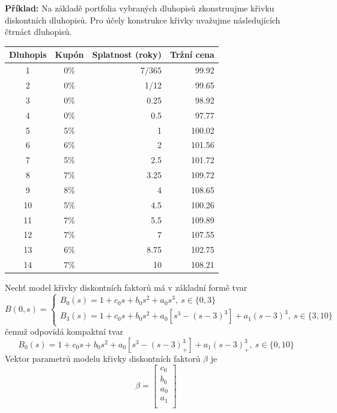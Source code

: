 \documentclass[a4paper]{book}
\begin{document}
\noindent \textbf{Příklad:} Na základě portfolia vybraných dluhopisů zkonstruujme křivku diskontních dluhopisů. Pro účely konstrukce křivky uvažujme následujících čtrnáct dluhopisů.
\begin{center}
\begin{tabular}{c c r r}
\textbf{Dluhopis} & \textbf{Kupón} & \textbf{Splatnost (roky)} & \textbf{Tržní cena}\\
\hline
 1 & 0\% & 7/365 &  99.92 \\
 2 & 0\% & 1/12  &  99.65 \\
 3 & 0\% & 0.25  &  98.92 \\
 4 & 0\% & 0.5   &  97.77 \\
 5 & 5\% & 1     & 100.02 \\
 6 & 6\% & 2     & 101.56 \\
 7 & 5\% & 2.5   & 101.72 \\
 8 & 7\% & 3.25  & 109.72 \\
 9 & 8\% & 4     & 108.65 \\
10 & 5\% & 4.5   & 100.26 \\
11 & 7\% & 5.5   & 109.89 \\
12 & 7\% & 7     & 107.55 \\
13 & 6\% & 8.75  & 102.75 \\
14 & 7\% & 10    & 108.21
\end{tabular}
\end{center}
Nechť model křivky diskontních faktorů má v základní formě tvar
\begin{equation*}
B(0,s) =
\begin{cases}
B_0(s) = 1 + c_0s + b_0s^2 + a_0s^3, ~ s \in \{0, 3\} \\
B_3(s) = 1 + c_0s + b_0s^2 + a_0[s^3 - (s - 3)^3] + a_1(s - 3)^3, ~ s \in \{ 3,10 \}
\end{cases}
\end{equation*}
čemuž odpovídá kompaktní tvar
\begin{equation*}
B_0(s) = 1 + c_0s + b_0s^2 + a_0[s^3 - (s - 3)_{+}^3] + a_1(s - 3)_{+}^3, ~ s \in \{ 0,10 \}
\end{equation*}
Vektor parametrů modelu křivky diskontních faktorů $\beta$ je
\begin{equation*}
\beta =
\begin{bmatrix}
c_0 \\
b_0 \\
a_0 \\
a_1 \\
\end{bmatrix}
\end{equation*}
\end{document}
